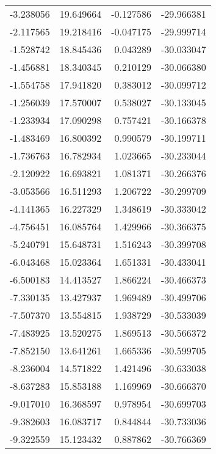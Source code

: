 \begin{tabular}{rrrr}
       -3.238056 &        19.649664 &   -0.127586 & -29.966381 \\
       -2.117565 &        19.218416 &   -0.047175 & -29.999714 \\
       -1.528742 &        18.845436 &    0.043289 & -30.033047 \\
       -1.456881 &        18.340345 &    0.210129 & -30.066380 \\
       -1.554758 &        17.941820 &    0.383012 & -30.099712 \\
       -1.256039 &        17.570007 &    0.538027 & -30.133045 \\
       -1.233934 &        17.090298 &    0.757421 & -30.166378 \\
       -1.483469 &        16.800392 &    0.990579 & -30.199711 \\
       -1.736763 &        16.782934 &    1.023665 & -30.233044 \\
       -2.120922 &        16.693821 &    1.081371 & -30.266376 \\
       -3.053566 &        16.511293 &    1.206722 & -30.299709 \\
       -4.141365 &        16.227329 &    1.348619 & -30.333042 \\
       -4.756451 &        16.085764 &    1.429966 & -30.366375 \\
       -5.240791 &        15.648731 &    1.516243 & -30.399708 \\
       -6.043468 &        15.023364 &    1.651331 & -30.433041 \\
       -6.500183 &        14.413527 &    1.866224 & -30.466373 \\
       -7.330135 &        13.427937 &    1.969489 & -30.499706 \\
       -7.507370 &        13.554815 &    1.938729 & -30.533039 \\
       -7.483925 &        13.520275 &    1.869513 & -30.566372 \\
       -7.852150 &        13.641261 &    1.665336 & -30.599705 \\
       -8.236004 &        14.571822 &    1.421496 & -30.633038 \\
       -8.637283 &        15.853188 &    1.169969 & -30.666370 \\
       -9.017010 &        16.368597 &    0.978954 & -30.699703 \\
       -9.382603 &        16.083717 &    0.844844 & -30.733036 \\
       -9.322559 &        15.123432 &    0.887862 & -30.766369 \\

\end{tabular}
